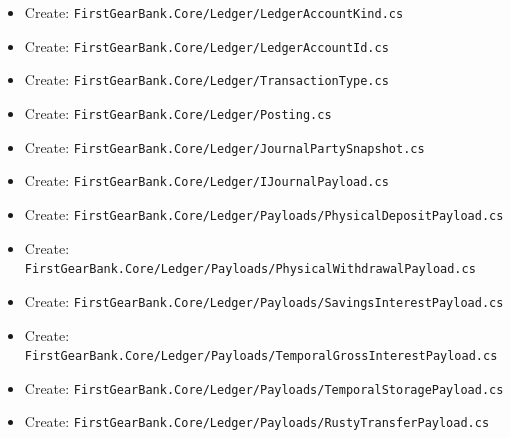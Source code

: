 \documentclass[
  10pt,
  letterpaper,
]{article}
\providecommand{\tightlist}{%
  \setlength{\itemsep}{0pt}\setlength{\parskip}{0pt}}
\begin{document}
\begin{itemize}
\tightlist
\item
  Create:
  \texttt{FirstGearBank.}\allowbreak{}\texttt{Core/}\allowbreak{}\texttt{Ledger/}\allowbreak{}\texttt{LedgerAccountKind.}\allowbreak{}\texttt{cs}
\item
  Create:
  \texttt{FirstGearBank.}\allowbreak{}\texttt{Core/}\allowbreak{}\texttt{Ledger/}\allowbreak{}\texttt{LedgerAccountId.}\allowbreak{}\texttt{cs}
\item
  Create:
  \texttt{FirstGearBank.}\allowbreak{}\texttt{Core/}\allowbreak{}\texttt{Ledger/}\allowbreak{}\texttt{TransactionType.}\allowbreak{}\texttt{cs}
\item
  Create:
  \texttt{FirstGearBank.}\allowbreak{}\texttt{Core/}\allowbreak{}\texttt{Ledger/}\allowbreak{}\texttt{Posting.}\allowbreak{}\texttt{cs}
\item
  Create:
  \texttt{FirstGearBank.}\allowbreak{}\texttt{Core/}\allowbreak{}\texttt{Ledger/}\allowbreak{}\texttt{JournalPartySnapshot.}\allowbreak{}\texttt{cs}
\item
  Create:
  \texttt{FirstGearBank.}\allowbreak{}\texttt{Core/}\allowbreak{}\texttt{Ledger/}\allowbreak{}\texttt{IJournalPayload.}\allowbreak{}\texttt{cs}
\item
  Create:
  \texttt{FirstGearBank.}\allowbreak{}\texttt{Core/}\allowbreak{}\texttt{Ledger/}\allowbreak{}\texttt{Payloads/}\allowbreak{}\texttt{PhysicalDepositPayload.}\allowbreak{}\texttt{cs}
\item
  Create:
  \texttt{FirstGearBank.}\allowbreak{}\texttt{Core/}\allowbreak{}\texttt{Ledger/}\allowbreak{}\texttt{Payloads/}\allowbreak{}\texttt{PhysicalWithdrawalPayload.}\allowbreak{}\texttt{cs}
\item
  Create:
  \texttt{FirstGearBank.}\allowbreak{}\texttt{Core/}\allowbreak{}\texttt{Ledger/}\allowbreak{}\texttt{Payloads/}\allowbreak{}\texttt{SavingsInterestPayload.}\allowbreak{}\texttt{cs}
\item
  Create:
  \texttt{FirstGearBank.}\allowbreak{}\texttt{Core/}\allowbreak{}\texttt{Ledger/}\allowbreak{}\texttt{Payloads/}\allowbreak{}\texttt{TemporalGrossInterestPayload.}\allowbreak{}\texttt{cs}
\item
  Create:
  \texttt{FirstGearBank.}\allowbreak{}\texttt{Core/}\allowbreak{}\texttt{Ledger/}\allowbreak{}\texttt{Payloads/}\allowbreak{}\texttt{TemporalStoragePayload.}\allowbreak{}\texttt{cs}
\item
  Create:
  \texttt{FirstGearBank.}\allowbreak{}\texttt{Core/}\allowbreak{}\texttt{Ledger/}\allowbreak{}\texttt{Payloads/}\allowbreak{}\texttt{RustyTransferPayload.}\allowbreak{}\texttt{cs}

\end{itemize}
\end{document}
